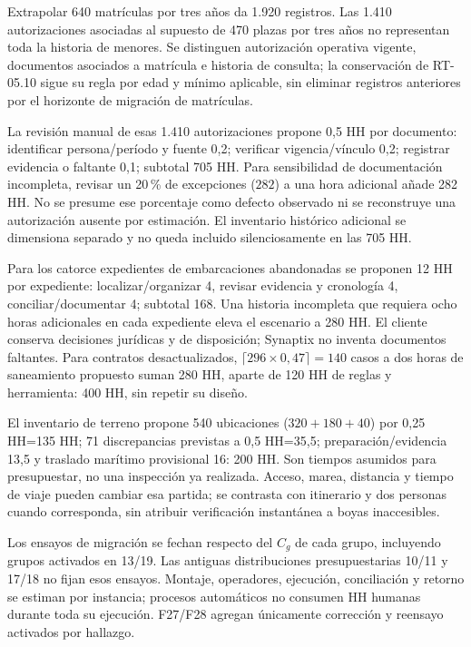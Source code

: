 Extrapolar 640 matrículas por tres años da 1.920 registros. Las 1.410 autorizaciones asociadas al supuesto de 470 plazas por tres años no representan toda la historia de menores. Se distinguen autorización operativa vigente, documentos asociados a matrícula e historia de consulta; la conservación de RT-05.10 sigue su regla por edad y mínimo aplicable, sin eliminar registros anteriores por el horizonte de migración de matrículas.

La revisión manual de esas 1.410 autorizaciones propone 0,5 HH por documento: identificar persona/período y fuente 0,2; verificar vigencia/vínculo 0,2; registrar evidencia o faltante 0,1; subtotal 705 HH. Para sensibilidad de documentación incompleta, revisar un 20\,\% de excepciones ($282$) a una hora adicional añade 282 HH. No se presume ese porcentaje como defecto observado ni se reconstruye una autorización ausente por estimación. El inventario histórico adicional se dimensiona separado y no queda incluido silenciosamente en las 705 HH.

Para los catorce expedientes de embarcaciones abandonadas se proponen 12 HH por expediente: localizar/organizar 4, revisar evidencia y cronología 4, conciliar/documentar 4; subtotal 168. Una historia incompleta que requiera ocho horas adicionales en cada expediente eleva el escenario a 280 HH. El cliente conserva decisiones jurídicas y de disposición; Synaptix no inventa documentos faltantes. Para contratos desactualizados, $\lceil296\times0{,}47\rceil=140$ casos a dos horas de saneamiento propuesto suman 280 HH, aparte de 120 HH de reglas y herramienta: 400 HH, sin repetir su diseño.

El inventario de terreno propone 540 ubicaciones ($320+180+40$) por 0,25 HH=135 HH; 71 discrepancias previstas a 0,5 HH=35,5; preparación/evidencia 13,5 y traslado marítimo provisional 16: 200 HH. Son tiempos asumidos para presupuestar, no una inspección ya realizada. Acceso, marea, distancia y tiempo de viaje pueden cambiar esa partida; se contrasta con itinerario y dos personas cuando corresponda, sin atribuir verificación instantánea a boyas inaccesibles.

Los ensayos de migración se fechan respecto del $C_g$ de cada grupo, incluyendo grupos activados en 13/19. Las antiguas distribuciones presupuestarias 10/11 y 17/18 no fijan esos ensayos. Montaje, operadores, ejecución, conciliación y retorno se estiman por instancia; procesos automáticos no consumen HH humanas durante toda su ejecución. F27/F28 agregan únicamente corrección y reensayo activados por hallazgo.


